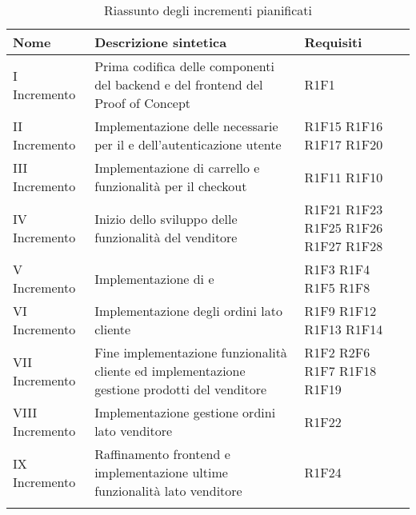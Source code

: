 \begin{center}
	\begin{longtable}{|p{2.5cm}|p{6.5cm}|p{6cm}|}
		\hline
		\rowcolor{lighter-grayer}
		\textbf{Nome}  & \textbf{Descrizione sintetica}                                                & \textbf{Requisiti} \\
		\hline
		\endfirsthead
		\hline
		\hline
		\endfoot
		\endlastfoot
		\hline
		I Incremento   & Prima codifica delle componenti del backend e del frontend del Proof of Concept & R1F1 \\
		II Incremento  & Implementazione delle \glock{API} necessarie per il \glock{PoC} e dell'autenticazione utente & R1F15 R1F16 R1F17 R1F20  \\
		III Incremento & Implementazione di carrello e funzionalità per il checkout   & R1F11 R1F10 \\
		IV Incremento  & Inizio dello sviluppo delle funzionalità del venditore & R1F21 R1F23 R1F25 R1F26 R1F27 R1F28          \\
		V Incremento   & Implementazione di \glock{PLP} e \glock{PDP}  & R1F3 R1F4 R1F5 R1F8 \\
		VI Incremento   & Implementazione degli ordini lato cliente   & R1F9 R1F12 R1F13 R1F14 \\
		VII Incremento   & Fine implementazione funzionalità cliente ed implementazione gestione prodotti del venditore     &  R1F2 R2F6 R1F7 R1F18 R1F19 \\
		VIII Incremento   & Implementazione gestione ordini lato venditore & R1F22    \\
		IX Incremento   & Raffinamento frontend e implementazione ultime funzionalità lato venditore & R1F24     \\
		
		 \hline
		\rowcolor{white}
		\caption{Riassunto degli incrementi pianificati}
	\end{longtable}
\end{center}